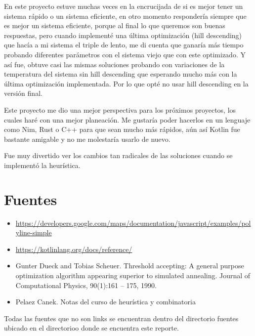 \documentclass{article}
\begin{document}
En este proyecto estuve muchas veces en la encrucijada de si es mejor tener un sistema rápido o un sistema eficiente, en otro momento respondería siempre que es mejor un sistema eficiente, porque al final lo que queremos son buenas respuestas, pero cuando implementé una última optimización (hill descending) que hacía a mi sistema el triple de lento, me di cuenta que ganaría más tiempo probando diferentes parámetros con el sistema viejo que con este optimizado. Y así fue, obtuve casi las mismas soluciones probando con variaciones de la temperatura del sistema sin hill descending que esperando mucho más con la última optimización implementada. Por lo que opté no usar hill descending en la versión final.

Este proyecto me dio una mejor perspectiva para los próximos proyectos, los cuales haré con una mejor planeación. Me gustaría poder hacerlos en un lenguaje como Nim, Rust o C++ para que sean mucho más rápidos, aún así Kotlin fue bastante amigable y no me molestaría usarlo de nuevo. 

Fue muy divertido ver los cambios tan radicales de las soluciones cuando se implementó la heurística.

\section{Fuentes}
\begin{itemize}
	\item \url{https://developers.google.com/maps/documentation/javascript/examples/polyline-simple}
	\item \url{https://kotlinlang.org/docs/reference/}
	\item Gunter Dueck and Tobias Scheuer. Threshold accepting: A general purpose optimization algorithm appearing superior to simulated annealing. Journal of Computational Physics, 90(1):161 – 175, 1990.
	\item Pelaez Canek. Notas del curso de heurística y combinatoria
\end{itemize}

Todas las fuentes que no son links se encuentran dentro del directorio fuentes ubicado en el directorioo donde se encuentra este reporte.
\end{document}
